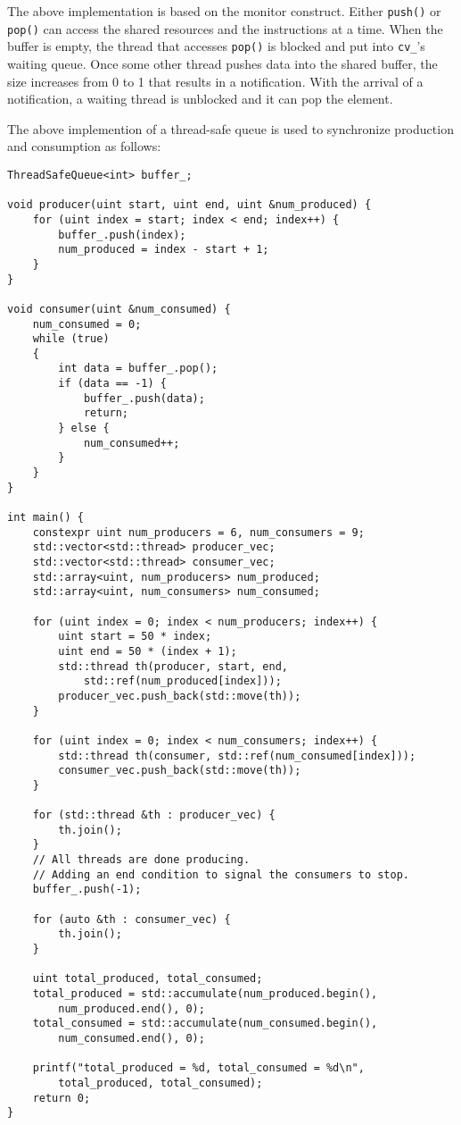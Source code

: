 \documentclass{scrartcl}
\begin{document}
The above implementation is based on the monitor construct. Either \texttt{push()} or \texttt{pop()} can access the shared resources and the instructions at a time. When the buffer is empty, the thread that accesses \texttt{pop()} is blocked and put into \texttt{cv_}'s waiting queue. Once some other thread pushes data into the shared buffer, the size increases from 0 to 1 that results in a notification. With the arrival of a notification, a waiting thread is unblocked and it can pop the element.

The above implemention of a thread-safe queue is used to synchronize production and consumption as follows:

\begin{verbatim}
ThreadSafeQueue<int> buffer_;

void producer(uint start, uint end, uint &num_produced) {
    for (uint index = start; index < end; index++) {
        buffer_.push(index);
        num_produced = index - start + 1;
    }
}

void consumer(uint &num_consumed) {
    num_consumed = 0;
    while (true)
    {
        int data = buffer_.pop();
        if (data == -1) {
            buffer_.push(data);
            return;
        } else {
            num_consumed++;
        }
    }
}

int main() {
    constexpr uint num_producers = 6, num_consumers = 9;
    std::vector<std::thread> producer_vec;
    std::vector<std::thread> consumer_vec;
    std::array<uint, num_producers> num_produced;
    std::array<uint, num_consumers> num_consumed;

    for (uint index = 0; index < num_producers; index++) {
        uint start = 50 * index;
        uint end = 50 * (index + 1);
        std::thread th(producer, start, end, 
            std::ref(num_produced[index]));
        producer_vec.push_back(std::move(th));
    }

    for (uint index = 0; index < num_consumers; index++) {
        std::thread th(consumer, std::ref(num_consumed[index]));
        consumer_vec.push_back(std::move(th));
    }

    for (std::thread &th : producer_vec) {
        th.join();
    }
    // All threads are done producing. 
    // Adding an end condition to signal the consumers to stop.
    buffer_.push(-1);

    for (auto &th : consumer_vec) {
        th.join();
    }

    uint total_produced, total_consumed;
    total_produced = std::accumulate(num_produced.begin(), 
        num_produced.end(), 0);
    total_consumed = std::accumulate(num_consumed.begin(), 
        num_consumed.end(), 0);
    
    printf("total_produced = %d, total_consumed = %d\n", 
        total_produced, total_consumed);
    return 0;
}
\end{verbatim}
\end{document}
